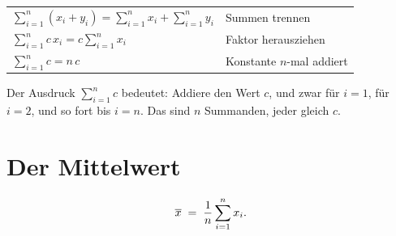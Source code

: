 \begin{merksatz}
\begin{center}
\renewcommand{\arraystretch}{1.6}
\begin{tabular}{@{}P{4.4cm}P{4.0cm}@{}}
\toprule
$\displaystyle\sum_{i=1}^n (x_i + y_i) = \sum_{i=1}^n x_i + \sum_{i=1}^n y_i$ & Summen trennen\\
$\displaystyle\sum_{i=1}^n c\,x_i = c \sum_{i=1}^n x_i$ & Faktor herausziehen\\
$\displaystyle\sum_{i=1}^n c = n\,c$ & Konstante $n$-mal addiert\\
\bottomrule
\end{tabular}
\end{center}

Der Ausdruck $\sum_{i=1}^n c$ bedeutet: Addiere den Wert $c$, und zwar für $i=1$, für $i=2$, und so fort bis $i=n$. Das sind $n$ Summanden, jeder gleich $c$.

\begin{center}
\begin{minipage}{0.88\textwidth}
\end{minipage}
\end{center}
\end{merksatz}

\section{Der Mittelwert}

\begin{definition}
\[ \overline{x} \;=\; \frac{1}{n}\sum_{i=1}^{n} x_i . \]
\end{definition}

